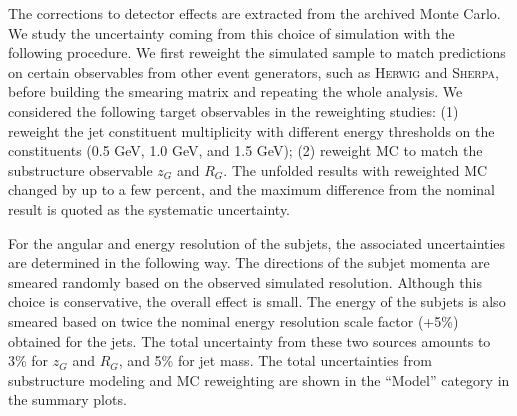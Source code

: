 \documentclass[aps,preprint,superscriptaddress,groupedaddress]{revtex4}  %
\newcommand{\sherpa}{\textsc{Sherpa}\xspace}
\newcommand{\herwig}{\textsc{Herwig}\xspace}
\begin{document}
The corrections to detector effects are extracted from the archived Monte Carlo.  We study the uncertainty coming from this choice of simulation with the following procedure.  We first reweight the simulated sample to match predictions on certain observables from other event generators, such as \herwig and \sherpa, before building the smearing matrix and repeating the whole analysis.  We considered the following target observables in the reweighting studies: (1) reweight the jet constituent multiplicity with different energy thresholds on the constituents (0.5 GeV, 1.0 GeV, and 1.5 GeV); (2) reweight MC to match the substructure observable $z_G$ and $R_G$.  The unfolded results with reweighted MC changed by up to a few percent, and the maximum difference from the nominal result is quoted as the systematic uncertainty.



For the angular and energy resolution of the subjets, the associated uncertainties are determined in the following way.
The directions of the subjet momenta are smeared randomly based on the observed simulated resolution.  Although this choice is conservative,  the overall effect is small.  The energy of the subjets is also smeared based on twice the nominal energy resolution scale factor (+5\%) obtained for the jets.  The total uncertainty from these two sources amounts to 3\% for $z_G$ and $R_G$, and 5\% for jet mass.  The total uncertainties from substructure modeling and MC reweighting are shown in the ``Model'' category in the summary plots.
\end{document}
